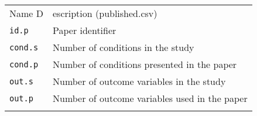 \documentclass[]{article}
\begin{document}
\begin{longtable}[c]{@{}ll@{}}
\toprule\addlinespace
\begin{minipage}[b]{0.24\columnwidth}\raggedright
Name D
\end{minipage} & \begin{minipage}[b]{0.69\columnwidth}\raggedright
escription (published.csv)
\end{minipage}
\\\addlinespace
\midrule\endhead
\begin{minipage}[t]{0.24\columnwidth}\raggedright
\texttt{id.p}
\end{minipage} & \begin{minipage}[t]{0.69\columnwidth}\raggedright
Paper identifier
\end{minipage}
\\\addlinespace
\begin{minipage}[t]{0.24\columnwidth}\raggedright
\texttt{cond.s}
\end{minipage} & \begin{minipage}[t]{0.69\columnwidth}\raggedright
Number of conditions in the study
\end{minipage}
\\\addlinespace
\begin{minipage}[t]{0.24\columnwidth}\raggedright
\texttt{cond.p}
\end{minipage} & \begin{minipage}[t]{0.69\columnwidth}\raggedright
Number of conditions presented in the paper
\end{minipage}
\\\addlinespace
\begin{minipage}[t]{0.24\columnwidth}\raggedright
\texttt{out.s}
\end{minipage} & \begin{minipage}[t]{0.69\columnwidth}\raggedright
Number of outcome variables in the study
\end{minipage}
\\\addlinespace
\begin{minipage}[t]{0.24\columnwidth}\raggedright
\texttt{out.p}
\end{minipage} & \begin{minipage}[t]{0.69\columnwidth}\raggedright
Number of outcome variables used in the paper
\end{minipage}
\\\addlinespace
\bottomrule
\end{longtable}
\end{document}
